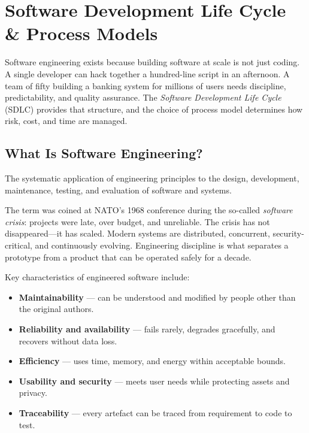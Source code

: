 \chapter{Software Development Life Cycle \& Process Models}
\label{ch:sdlc}

Software engineering exists because building software at scale is not just coding. A single developer can hack together a hundred-line script in an afternoon. A team of fifty building a banking system for millions of users needs discipline, predictability, and quality assurance. The \emph{Software Development Life Cycle} (SDLC) provides that structure, and the choice of process model determines how risk, cost, and time are managed.

\section{What Is Software Engineering?}

\begin{definition}
The systematic application of engineering principles to the design, development, maintenance, testing, and evaluation of software and systems.
\end{definition}

The term was coined at NATO's 1968 conference during the so-called \emph{software crisis}: projects were late, over budget, and unreliable. The crisis has not disappeared---it has scaled. Modern systems are distributed, concurrent, security-critical, and continuously evolving. Engineering discipline is what separates a prototype from a product that can be operated safely for a decade.

Key characteristics of engineered software include:
\begin{itemize}
    \item \textbf{Maintainability} --- can be understood and modified by people other than the original authors.
    \item \textbf{Reliability and availability} --- fails rarely, degrades gracefully, and recovers without data loss.
    \item \textbf{Efficiency} --- uses time, memory, and energy within acceptable bounds.
    \item \textbf{Usability and security} --- meets user needs while protecting assets and privacy.
    \item \textbf{Traceability} --- every artefact can be traced from requirement to code to test.
\end{itemize}


